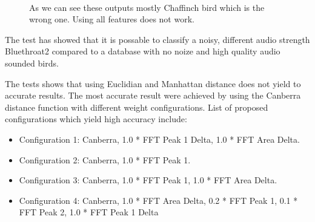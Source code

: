 \begin{figure}[htp]
    ~

    \caption{As we can see these outputs mostly Chaffinch bird which is the wrong one. Using all features does not work.}
    \label{fig:results6}
\end{figure}

The test has showed that it is possable to classify a noisy, different audio strength Bluethroat2 compared to a database with no noize and high quality audio sounded birds.

The tests shows that using Euclidian and Manhattan distance does not yield to accurate results.
The most accurate result were achieved by using the Canberra distance function with different
weight configurations. List of proposed configurations which yield high accuracy include:
\begin{itemize}
  \item Configuration 1: Canberra, 1.0 * FFT Peak 1 Delta, 1.0 * FFT Area Delta.
  \item Configuration 2: Canberra, 1.0 * FFT Peak 1.
  \item Configuration 3: Canberra, 1.0 * FFT Peak 1, 1.0 * FFT Area Delta.
  \item Configuration 4: Canberra, 1.0 * FFT Area Delta, 0.2 * FFT Peak 1, 0.1 * FFT Peak 2, 1.0 * FFT Peak 1 Delta
\end{itemize}

